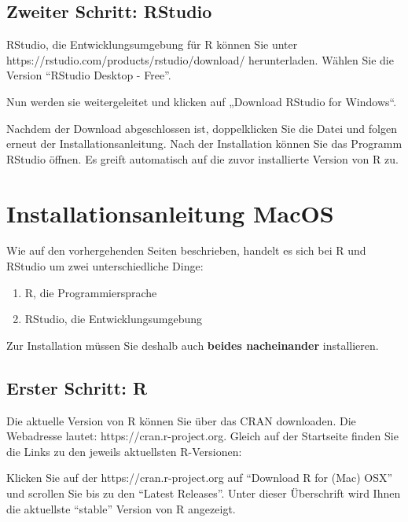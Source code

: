 \documentclass[
]{book}
\begin{document}
\hypertarget{zweiter-schritt-rstudio}{%
\subsection{Zweiter Schritt: RStudio}\label{zweiter-schritt-rstudio}}

RStudio, die Entwicklungsumgebung für R können Sie unter https://rstudio.com/products/rstudio/download/ herunterladen.
Wählen Sie die Version ``RStudio Desktop - Free''.

Nun werden sie weitergeleitet und klicken auf „Download RStudio for Windows``.

Nachdem der Download abgeschlossen ist, doppelklicken Sie die Datei und folgen erneut der Installationsanleitung. Nach der Installation können Sie das Programm RStudio öffnen. Es greift automatisch auf die zuvor installierte Version von R zu.

\hypertarget{installationsanleitung-macos}{%
\section{Installationsanleitung MacOS}\label{installationsanleitung-macos}}

Wie auf den vorhergehenden Seiten beschrieben, handelt es sich bei R und RStudio um zwei unterschiedliche Dinge:

\begin{enumerate}
\def\labelenumi{\arabic{enumi}.}
\item
  R, die Programmiersprache
\item
  RStudio, die Entwicklungsumgebung
\end{enumerate}

Zur Installation müssen Sie deshalb auch \textbf{beides nacheinander} installieren.

\hypertarget{erster-schritt-r-1}{%
\subsection{Erster Schritt: R}\label{erster-schritt-r-1}}

Die aktuelle Version von R können Sie über das CRAN downloaden. Die Webadresse lautet: https://cran.r-project.org. Gleich auf der Startseite finden Sie die Links zu den jeweils aktuellsten R-Versionen:

Klicken Sie auf der https://cran.r-project.org auf ``Download R for (Mac) OSX'' und scrollen Sie bis zu den ``Latest Releases''. Unter dieser Überschrift wird Ihnen die aktuellste ``stable'' Version von R angezeigt.
\end{document}
